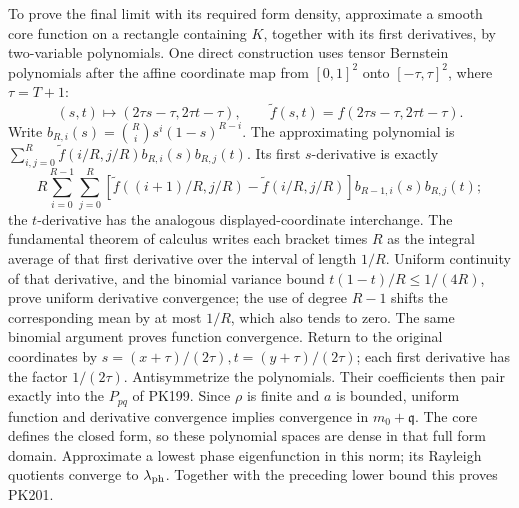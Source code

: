 \documentclass[11pt]{article}
\begin{document}
To prove the final limit with its required form density, approximate
a smooth core function on a rectangle containing \(K\), together
with its first derivatives, by two-variable polynomials. One direct
construction uses tensor Bernstein polynomials after the affine
coordinate map from \([0,1]^2\) onto \([-\tau,\tau]^2\), where
\(\tau=T+1\):
\[
 (s,t)\longmapsto(2\tau s-\tau,2\tau t-\tau),\qquad
 \widetilde f(s,t)=f(2\tau s-\tau,2\tau t-\tau).
\]
Write \(b_{R,i}(s)=\binom Ri s^i(1-s)^{R-i}\).
The approximating polynomial is
\(\sum_{i,j=0}^R\widetilde f(i/R,j/R)b_{R,i}(s)b_{R,j}(t)\).
Its first \(s\)-derivative is exactly
\[
 R\sum_{i=0}^{R-1}\sum_{j=0}^R
 [\widetilde f((i+1)/R,j/R)-\widetilde f(i/R,j/R)]
                   b_{R-1,i}(s)b_{R,j}(t);
\]
the \(t\)-derivative has the analogous displayed-coordinate
interchange. The fundamental theorem of calculus writes each
bracket times \(R\) as the integral average of that first
derivative over the interval of length \(1/R\).
Uniform continuity of that derivative, and the binomial variance
bound \(t(1-t)/R\le1/(4R)\), prove uniform derivative convergence;
the use of degree \(R-1\) shifts the corresponding mean by at
most \(1/R\), which also tends to zero. The same binomial
argument proves function convergence.
Return to the original coordinates by
\(s=(x+\tau)/(2\tau),t=(y+\tau)/(2\tau)\);
each first derivative has the factor \(1/(2\tau)\).
Antisymmetrize the polynomials. Their coefficients then
pair exactly into the \(P_{pq}\) of PK199. Since \(\rho\) is finite
and \(a\) is bounded, uniform function and derivative convergence
implies convergence in \(m_0+\mathfrak q\).
The core defines the closed form, so these polynomial spaces
are dense in that full form domain.
Approximate a lowest phase eigenfunction in this norm; its
Rayleigh quotients converge to \(\lambda_{\rm ph}\).
Together with the preceding lower bound this proves PK201.
\end{document}
